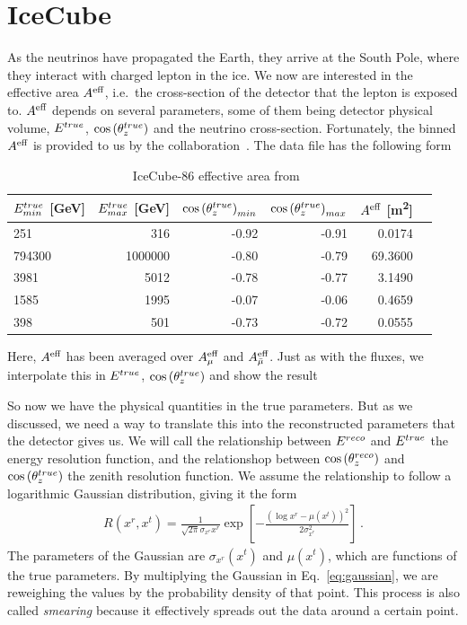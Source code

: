 % 
% 

\section{IceCube}\label{ch:ICmethod}
As the neutrinos have propagated the Earth, they arrive at the South Pole, where they interact with charged lepton in the ice. We now are interested in the effective area $A^\text{eff}$, 
i.e.~the cross-section of the detector that the lepton is exposed to.
$A^\text{eff}$ depends on several parameters, some of them being detector physical volume, $E^{true}$, $\cos{(\theta_z^{true})}$ and the neutrino cross-section. Fortunately, the binned $A^\text{eff}$ is provided to us by the collaboration~\cite{ICaeff}.
The data file has the following form

\begin{table}[h]\label{table:aeff}
    \centering
    \begin{tabular}{lrrrrr}
        \hline \hline
        $E^{true}_{min}$ [\si{\GeV}] &     $E^{true}_{max}$ [\si{\GeV}]&   $\cos{(\theta_z^{true})}_{min}$ &   $\cos{(\theta_z^{true})}_{max}$ &     $A^\text{eff}$ [\si{\metre\squared}] \\
        \hline
             251 &      316 &  -0.92 &  -0.91 &   0.0174 \\
          794300 &  1000000 &  -0.80 &  -0.79 &  69.3600 \\
            3981 &     5012 &  -0.78 &  -0.77 &   3.1490 \\
            1585 &     1995 &  -0.07 &  -0.06 &   0.4659 \\
            398 &      501 &  -0.73 &  -0.72 &   0.0555 \\
        \hline \hline
        \end{tabular}
    \caption{IceCube-86 effective area from~\cite{ICaeff}}
\end{table}

Here, $A^\text{eff}$ has been averaged over $A^\text{eff}_\mu$ and $A^\text{eff}_{\bar{\mu}}$.
Just as with the fluxes, we interpolate this in $E^{true}$, $\cos{(\theta_z^{true})}$ and show the result %

So now we have the physical quantities in the true parameters. But as we discussed, we need a way to translate this into the reconstructed parameters that the detector gives us. We will call the relationship between 
$E^{reco}$ and $E^{true}$ the energy resolution function, and the relationshop between $\cos{(\theta_z^{reco})}$ and $\cos{(\theta_z^{true})}$ the zenith resolution function. We assume the relationship to follow a logarithmic Gaussian distribution, giving it the form 
\begin{align}\label{eq:gaussian}
    R(x^r, x^t) = \frac{1}{\sqrt{2\pi} \sigma_{x^r}x^r} \exp\left[-\frac{(\log x^r-\mu(x^t))^2}{2\sigma_{x^r}^2}\right]\,.
\end{align}
The parameters of the Gaussian are $\sigma_{x^r}(x^t)$ and $\mu(x^t)$, which are functions of the true parameters. By multiplying the Gaussian in Eq.~\ref{eq:gaussian}, we are reweighing the values by the 
probability density of that point. This process is also called \emph{smearing} because it effectively spreads out the data around a certain point. 

